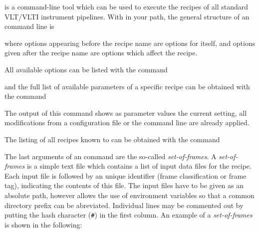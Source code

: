 
\textit{\esorex{}} is a command-line tool which can be used to execute the
recipes of all standard VLT/VLTI instrument pipelines. With \textit{\esorex{}}
in your path, the general structure of an \textit{\esorex{}} 
command line is

\begin{shell}[fontsize=\small]
\end{shell}

where options appearing before the recipe name are options for
\textit{\esorex{}} itself, and options given after the recipe name are options
which affect the recipe. 

All available \textit{\esorex{}} options can be listed with the command
\begin{shell}[fontsize=\small]
\end{shell}

and the full list of available parameters of a specific recipe can be obtained
with the command 

\begin{shell}[fontsize=\small]
\end{shell}
The output of this command shows as parameter values the current setting, \ie
all modifications from a configuration file or the command line are already
applied.

The listing of all recipes known to \textit{\esorex{}} can be obtained with the command
\begin{shell}[fontsize=\small]
\end{shell}

The last arguments of an \textit{\esorex{}} command are the so-called
\textit{set-of-frames}. A \textit{set-of-frames} is a simple text file which
contains a list of input data files for the recipe. Each input file is
followed by an unique identifier (frame classification or frame tag),
indicating the contents of this file. The input files have to be given as an
absolute path, however \textit{\esorex{}} allows the use of environment variables so
that a common directory prefix can be abreviated. Individual lines may be
commented out by putting the hash character (\texttt{\#}) in the first
column. An example of a \textit{set-of-frames} is shown in the following:

